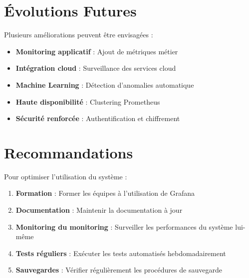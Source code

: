 \documentclass[12pt,a4paper]{report}
\begin{document}
\section{Évolutions Futures}

Plusieurs améliorations peuvent être envisagées :

\begin{itemize}
    \item \textbf{Monitoring applicatif} : Ajout de métriques métier
    \item \textbf{Intégration cloud} : Surveillance des services cloud
    \item \textbf{Machine Learning} : Détection d'anomalies automatique
    \item \textbf{Haute disponibilité} : Clustering Prometheus
    \item \textbf{Sécurité renforcée} : Authentification et chiffrement
\end{itemize}

\section{Recommandations}

Pour optimiser l'utilisation du système :

\begin{enumerate}
    \item \textbf{Formation} : Former les équipes à l'utilisation de Grafana
    \item \textbf{Documentation} : Maintenir la documentation à jour
    \item \textbf{Monitoring du monitoring} : Surveiller les performances du système lui-même
    \item \textbf{Tests réguliers} : Exécuter les tests automatisés hebdomadairement
    \item \textbf{Sauvegardes} : Vérifier régulièrement les procédures de sauvegarde
\end{enumerate}
\end{document}
